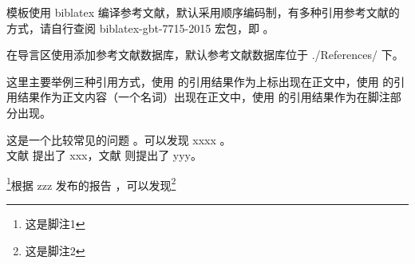 模板使用 biblatex 编译参考文献，默认采用顺序编码制，有多种引用参考文献的方式，请自行查阅 biblatex-gbt-7715-2015 宏包，即 。

在导言区使用\clist{}添加参考文献数据库，默认参考文献数据库位于 ./References/ 下。

这里主要举例三种引用方式，使用  的引用结果作为上标出现在正文中，使用  的引用结果作为正文内容（一个名词）出现在正文中，使用  的引用结果作为在脚注部分出现。



\begin{texcode}[]{}
  这是一个比较常见的问题 \cite{barella_situ_2021}。可以发现 xxxx \cite{atta_enhanced_2021}。\\

  文献\parencite{张燕2013电气自动化在电气工程中的应用探讨} 提出了 xxx，文献 \parencite{黄雪芳2012探讨电气工程中自动化技术的应用} 则提出了 yyy。

\end{texcode}

\footnote{这是脚注1}根据 zzz 发布的报告 ，可以发现\footnote{这是脚注2}